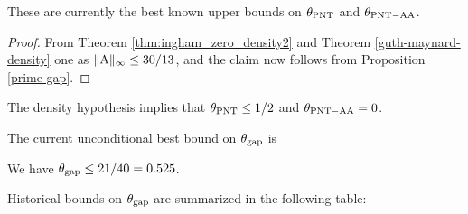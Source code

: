 These are currently the best known upper bounds on $\theta_{\mathrm{PNT}}$ and $\theta_{\mathrm{PNT-AA}}$.

\begin{proof}  From Theorem \ref{thm:ingham_zero_density2} and Theorem \ref{guth-maynard-density} one as $\|\mathrm{A}\|_\infty \leq 30/13$, and the claim now follows from Proposition \ref{prime-gap}.
\end{proof}

\begin{corollary}  The density hypothesis implies that $\theta_{\mathrm{PNT}} \leq 1/2$ and $\theta_{\mathrm{PNT-AA}} = 0$.
\end{corollary}

The current unconditional best bound on $\theta_{\mathrm{gap}}$ is

\begin{theorem}\label{bhp-thm}\cite{baker-harman-pintz} We have $\theta_{\mathrm{gap}} \leq 21/40= 0.525$.
\end{theorem}

Historical bounds on $\theta_{\mathrm{gap}}$ are summarized in the following table:

